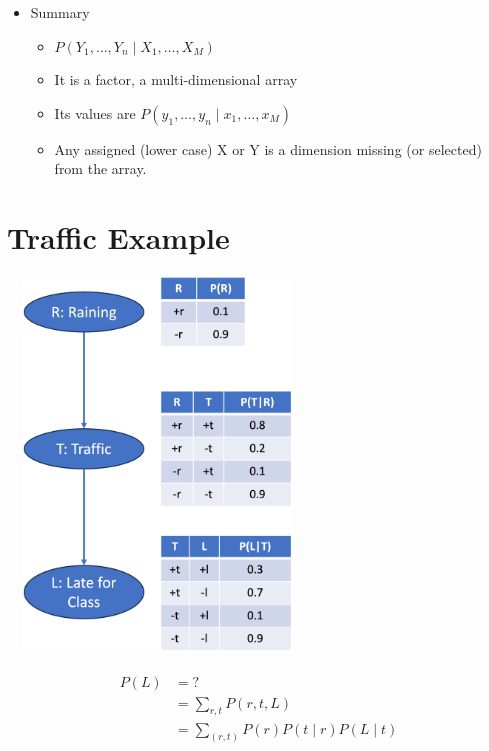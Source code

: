 \documentclass[11pt,a4paper]{report}
\begin{document}
\begin{itemize}
    \item Summary
        \begin{itemize}
            \item $P(Y_{1}, \ldots, Y_{n} \mid X_{1}, \ldots, X_{M})$
            \item It is a factor, a multi-dimensional array
            \item Its values are $P(y_{1}, \ldots, y_{n} \mid x_{1}, \ldots, x_{M})$
            \item Any assigned (lower case) X or Y is a dimension missing (or selected) from the array.
        \end{itemize}
    
\end{itemize}

\section{Traffic Example}

\includegraphics[width = 8cm, height = 10cm]{traffic_eg.png}

\begin{center}
    \begin{equation}
        \begin{split}
            P(L) & = ? \\
            & = \sum_{r,t}P(r,t,L) \\
            & = \sum_(r,t)P(r)P(t \mid r)P(L \mid t) \\
        \end{split}
    \end{equation}
\end{center}
\end{document}
